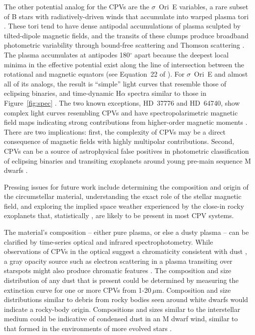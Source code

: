 \documentclass{nature3}
\begin{document}
The other potential analog for the CPVs are the $\sigma$~Ori~E
variables, a rare subset of B stars with radiatively-driven winds that
accumulate into warped plasma tori \cite{Townsend2005,Townsend2008}.
These tori tend to have dense antipodal accumulations of plasma
sculpted by tilted-dipole magnetic fields, and the transits of these
clumps produce broadband photometric variability through bound-free
scattering \cite{Townsend2005} and Thomson scattering
\cite{Berry2022}.  
The plasma accumulates at antipodes 180$^\circ$ apart because the
deepest local minima in the effective potential exist along the line
of intersection between the rotational and magnetic equators (see
Equation~22 of \cite{Townsend2005}).
For $\sigma$~Ori~E and almost
all of its analogs, the result is ``simple'' light curves that 
resemble those of eclipsing binaries, and time-dynamic H$\alpha$
spectra similar to those in Figure~\ref{fig:spec}
\cite{Townsend2005,Townsend2008}.  The two known exceptions, HD~37776
and HD~64740, show complex light curves resembling CPVs
\cite{Mikulasek2020,Bouma2024} and have spectropolarimetric magnetic
field maps indicating strong contributions from higher-order magnetic
moments \cite{Kochukhov2011,Shultz2018}.  There are two implications:
first, the complexity of CPVs may be a direct consequence of magnetic
fields with highly multipolar contributions.  Second, CPVs can be a
source of astrophysical false positives in photometric classification
of eclipsing binaries and transiting exoplanets around young pre-main
sequence M dwarfs \cite{Johns-Krull2016,Bouma2020}.

Pressing issues for future work include determining the composition
and origin of the circumstellar material, understanding the exact role
of the stellar magnetic field, and exploring the implied space weather
experienced by the close-in rocky exoplanets that, statistically
\cite{Dressing2015}, are likely to be present in most CPV systems.

The material's composition -- either pure plasma, or else a dusty
plasma -- can be clarified by time-series optical and infrared
spectrophotometry.  While observations of CPVs in the optical 
suggest a chromaticity consistent with dust
\cite{Tanimoto2020,Gunther2022,Koen2023}, a gray opacity source such
as electron scattering in a plasma transiting over starspots might
also produce chromatic features \cite{Rackham2018}.  The composition
and size distribution of any dust that is present could be determined
by measuring the extinction curve for one or more CPVs from
1-20\,$\mu$m.  Composition and size distributions similar to debris
from rocky bodies seen around white dwarfs \cite{Reach2009} would
indicate a rocky-body origin.  Compositions and sizes similar to the
interstellar medium could be indicative of condensed dust in an M
dwarf wind, similar to that formed in the environments of more evolved
stars \cite{Marigo2008}.
\end{document}
